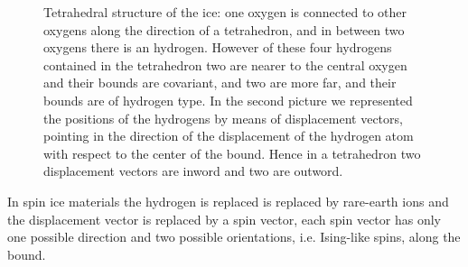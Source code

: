 \documentclass[../main/main.tex]{subfiles}
\begin{document}
\begin{figure}[h]
\caption{Tetrahedral structure of the ice: one oxygen is connected to other oxygens along the direction of a tetrahedron, and in between two oxygens there is an hydrogen. However of these four hydrogens contained in the tetrahedron two are nearer to the central oxygen and their bounds are covariant, and two are more far, and their bounds are of hydrogen type. In the second picture we represented the positions of the hydrogens by means of displacement vectors, pointing in the direction of the displacement of the hydrogen atom with respect to the center of the bound. Hence in a tetrahedron two displacement vectors are inword and two are outword.}
\label{fig:ice}
\end{figure}

In spin ice materials the hydrogen is replaced is replaced by rare-earth ions and the displacement vector is replaced by a spin vector, each spin vector has only one possible direction and two possible orientations, i.e. Ising-like spins, along the bound. 
\end{document}
